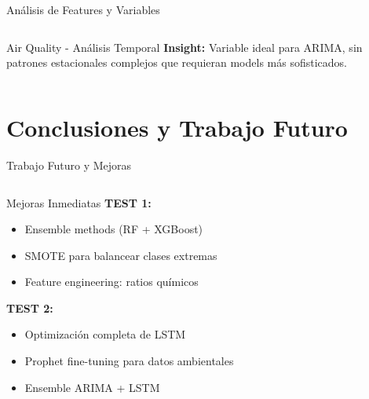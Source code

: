 \documentclass[aspectratio=169]{beamer}
\begin{document}
\begin{frame}{Análisis de Features y Variables}
\begin{columns}[T]
\begin{column}{0.48\textwidth}
\begin{block}{Air Quality - Análisis Temporal}
                \vspace{0.3cm}
                \textbf{Insight:} Variable ideal para ARIMA, sin patrones estacionales complejos que requieran models más sofisticados.
            \end{block}
        \end{column}
    \end{columns}
\end{frame}

\section{Conclusiones y Trabajo Futuro}

\begin{frame}{Trabajo Futuro y Mejoras}
    \begin{columns}[T]
        \begin{column}{0.48\textwidth}
            \begin{block}{Mejoras Inmediatas}
                \textbf{TEST 1:}
                \begin{itemize}
                    \item Ensemble methods (RF + XGBoost)
                    \item SMOTE para balancear clases extremas
                    \item Feature engineering: ratios químicos
                \end{itemize}
                
                \textbf{TEST 2:}
                \begin{itemize}
                    \item Optimización completa de LSTM
                    \item Prophet fine-tuning para datos ambientales
                    \item Ensemble ARIMA + LSTM
                \end{itemize}
            \end{block}
        \end{column}
        

\end{columns}
\end{frame}
\end{document}
